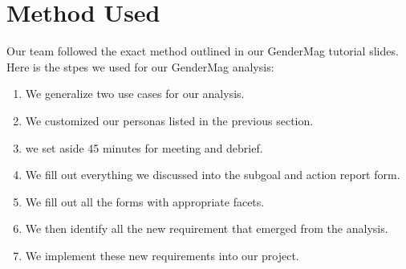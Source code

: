 \documentclass[12pt, titlepage]{article}
\begin{document}
\section{Method Used}
Our team followed the exact method outlined in our GenderMag tutorial slides. Here is the stpes we used for our GenderMag analysis:
\begin{enumerate}
    \item We generalize two use cases for our analysis.
    \item We customized our personas listed in the previous section.
    \item we set aside 45 minutes for meeting and debrief.
    \item We fill out everything we discussed into the subgoal and action report form.
    \item We fill out all the forms with appropriate facets.
    \item We then identify all the new requirement that emerged from the analysis.
    \item We implement these new requirements into our project.
\end{enumerate}
\end{document}
